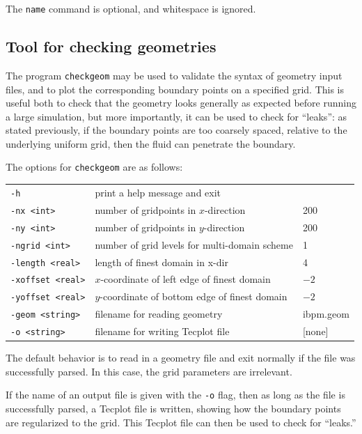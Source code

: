 \documentclass[11pt]{article}
\begin{document}
The {\tt name} command is optional, and whitespace is ignored.

\subsection{Tool for checking geometries}
\label{sub:tool_for_checking_geometries}
The program {\tt checkgeom} may be used to validate the syntax of geometry input files, and to plot the corresponding boundary points on a specified grid.  This is useful both to check that the geometry looks generally as expected before running a large simulation, but more importantly, it can be used to check for ``leaks'': as stated previously, if the boundary points are too coarsely spaced, relative to the underlying uniform grid, then the fluid can penetrate the boundary.

The options for {\tt checkgeom} are as follows:

\begin{center}
	\begin{tabular}{lll}
	  \verb|-h|                 & print a help message and exit \\
	  \verb|-nx <int>|          & number of gridpoints in $x$-direction & 200 \\
	  \verb|-ny <int>|          & number of gridpoints in $y$-direction & 200 \\
	  \verb|-ngrid <int>|       & number of grid levels for multi-domain scheme & 1 \\
	  \verb|-length <real>|     & length of finest domain in x-dir & 4 \\
	  \verb|-xoffset <real>|    & $x$-coordinate of left edge of finest domain & $-2$ \\
	  \verb|-yoffset <real>|    & $y$-coordinate of bottom edge of finest domain & $-2$ \\
	  \verb|-geom <string>|     & filename for reading geometry & ibpm.geom \\
	  \verb|-o <string>|       & filename for writing Tecplot file & [none]
	\end{tabular}
\end{center}

The default behavior is to read in a geometry file and exit normally if the file was successfully parsed.  In this case, the grid parameters are irrelevant.

If the name of an output file is given with the {\tt -o} flag, then as long as the file is successfully parsed, a Tecplot file is written, showing how the boundary points are regularized to the grid.  This Tecplot file can then be used to check for ``leaks.''
\end{document}
